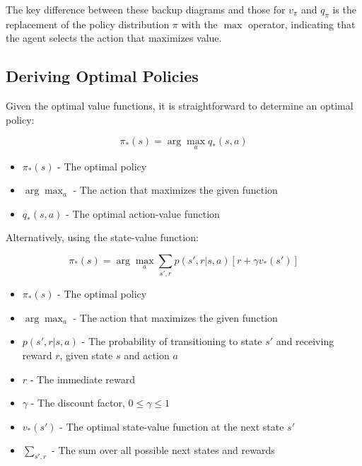 \documentclass[12pt,a4paper]{article}
\begin{document}
The key difference between these backup diagrams and those for $v_\pi$ and $q_\pi$ is the replacement of the policy distribution $\pi$ with the $\max$ operator, indicating that the agent selects the action that maximizes value.

\subsection{Deriving Optimal Policies}

Given the optimal value functions, it is straightforward to determine an optimal policy:

\begin{equation}
\pi_*(s) = \arg\max_a q_*(s,a)
\end{equation}

\begin{tcolorbox}[title=Notation Overview]
\begin{itemize}
    \item $\pi_*(s)$ - The optimal policy
    \item $\arg\max_a$ - The action that maximizes the given function
    \item $q_*(s,a)$ - The optimal action-value function
\end{itemize}
\end{tcolorbox}

Alternatively, using the state-value function:

\begin{equation}
\pi_*(s) = \arg\max_a \sum_{s',r} p(s',r|s,a) [r + \gamma v_*(s')]
\end{equation}

\begin{tcolorbox}[title=Notation Overview]
\begin{itemize}
    \item $\pi_*(s)$ - The optimal policy
    \item $\arg\max_a$ - The action that maximizes the given function
    \item $p(s',r|s,a)$ - The probability of transitioning to state $s'$ and receiving reward $r$, given state $s$ and action $a$
    \item $r$ - The immediate reward
    \item $\gamma$ - The discount factor, $0 \leq \gamma \leq 1$
    \item $v_*(s')$ - The optimal state-value function at the next state $s'$
    \item $\sum_{s',r}$ - The sum over all possible next states and rewards
\end{itemize}
\end{tcolorbox}
\end{document}
